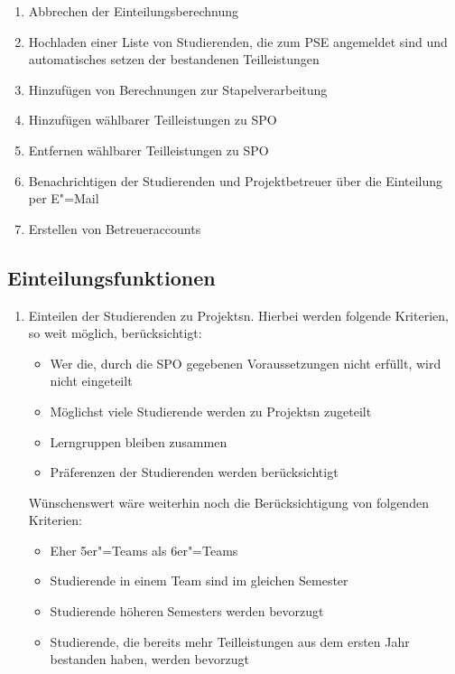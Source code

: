 \documentclass[parskip=full]{scrartcl}
\newcommand{\swtLabel}[1]{\textbf{/#1\arabic*0/}}
\begin{document}
\begin{enumerate}[label=\swtLabel{FA}, resume]
  \item Abbrechen der Einteilungsberechnung \label{FAabbruch}
  \item Hochladen einer Liste von Studierenden, die zum PSE angemeldet sind
	    und automatisches setzen der bestandenen Teilleistungen \label{FAimport2}
  \item Hinzufügen von Berechnungen zur Stapelverarbeitung \label{FAadminStapel}
  \item Hinzufügen wählbarer Teilleistungen zu SPO \label{FAadminSPOhinzufügen}
  \item Entfernen wählbarer Teilleistungen zu SPO \label{FAadminSPOentfernen}
  \item Benachrichtigen der Studierenden und Projektbetreuer über die Einteilung
  per E"=Mail \label{FAadminBenachrichtigen}
  \item Erstellen von Betreueraccounts \label{FAadminCreateAccounts}
\end{enumerate}

\subsection{Einteilungsfunktionen}

\begin{enumerate}[label=\swtLabel{FA}, resume]
  \item Einteilen der Studierenden zu \glspl{Projekt}n. Hierbei werden folgende
  Kriterien, so weit möglich, berücksichtigt:
  \begin{itemize}
    \item Wer die, durch die \gls{SPO} gegebenen Voraussetzungen nicht erfüllt,
    wird nicht eingeteilt \label{FAeinteilung}
    \item Möglichst viele Studierende werden zu \glspl{Projekt}n zugeteilt 
    \item Lerngruppen bleiben zusammen
    \item Präferenzen der Studierenden werden berücksichtigt
  \end{itemize}
 Wünschenswert wäre weiterhin noch die Berücksichtigung von folgenden Kriterien:  
 \begin{itemize}
   \item Eher 5er"=Teams als 6er"=Teams
   \item Studierende in einem Team sind im gleichen Semester
   \item Studierende höheren Semesters werden bevorzugt
   \item Studierende, die bereits mehr Teilleistungen aus dem ersten Jahr
bestanden haben, werden bevorzugt 
 \end{itemize}
\end{enumerate}
\end{document}
